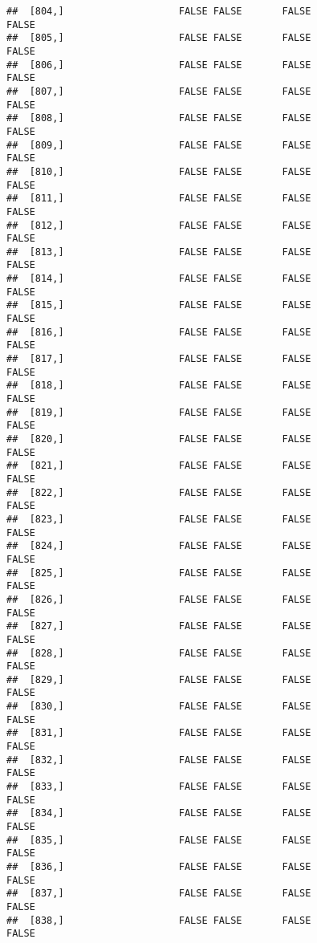 \documentclass[
]{article}
\begin{document}
\begin{verbatim}
##  [804,]                    FALSE FALSE       FALSE                FALSE
##  [805,]                    FALSE FALSE       FALSE                FALSE
##  [806,]                    FALSE FALSE       FALSE                FALSE
##  [807,]                    FALSE FALSE       FALSE                FALSE
##  [808,]                    FALSE FALSE       FALSE                FALSE
##  [809,]                    FALSE FALSE       FALSE                FALSE
##  [810,]                    FALSE FALSE       FALSE                FALSE
##  [811,]                    FALSE FALSE       FALSE                FALSE
##  [812,]                    FALSE FALSE       FALSE                FALSE
##  [813,]                    FALSE FALSE       FALSE                FALSE
##  [814,]                    FALSE FALSE       FALSE                FALSE
##  [815,]                    FALSE FALSE       FALSE                FALSE
##  [816,]                    FALSE FALSE       FALSE                FALSE
##  [817,]                    FALSE FALSE       FALSE                FALSE
##  [818,]                    FALSE FALSE       FALSE                FALSE
##  [819,]                    FALSE FALSE       FALSE                FALSE
##  [820,]                    FALSE FALSE       FALSE                FALSE
##  [821,]                    FALSE FALSE       FALSE                FALSE
##  [822,]                    FALSE FALSE       FALSE                FALSE
##  [823,]                    FALSE FALSE       FALSE                FALSE
##  [824,]                    FALSE FALSE       FALSE                FALSE
##  [825,]                    FALSE FALSE       FALSE                FALSE
##  [826,]                    FALSE FALSE       FALSE                FALSE
##  [827,]                    FALSE FALSE       FALSE                FALSE
##  [828,]                    FALSE FALSE       FALSE                FALSE
##  [829,]                    FALSE FALSE       FALSE                FALSE
##  [830,]                    FALSE FALSE       FALSE                FALSE
##  [831,]                    FALSE FALSE       FALSE                FALSE
##  [832,]                    FALSE FALSE       FALSE                FALSE
##  [833,]                    FALSE FALSE       FALSE                FALSE
##  [834,]                    FALSE FALSE       FALSE                FALSE
##  [835,]                    FALSE FALSE       FALSE                FALSE
##  [836,]                    FALSE FALSE       FALSE                FALSE
##  [837,]                    FALSE FALSE       FALSE                FALSE
##  [838,]                    FALSE FALSE       FALSE                FALSE

\end{verbatim}
\end{document}
